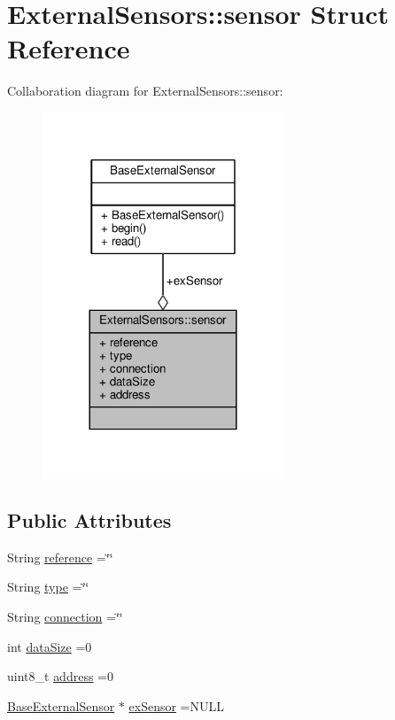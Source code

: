 \hypertarget{structExternalSensors_1_1sensor}{}\section{External\+Sensors\+:\+:sensor Struct Reference}
\label{structExternalSensors_1_1sensor}


Collaboration diagram for External\+Sensors\+:\+:sensor\+:
\nopagebreak
\begin{figure}[H]
\begin{center}
\leavevmode
\includegraphics[width=204pt]{structExternalSensors_1_1sensor__coll__graph}
\end{center}
\end{figure}
\subsection*{Public Attributes}
\begin{DoxyCompactItemize}
\item 
String \hyperlink{structExternalSensors_1_1sensor_afed5bdfd49732202a368b600cb8396fe}{reference} =\char`\"{}\char`\"{}
\item 
String \hyperlink{structExternalSensors_1_1sensor_a6acfdb02c742c2110d7bd2b5d9fce9e7}{type} =\char`\"{}\char`\"{}
\item 
String \hyperlink{structExternalSensors_1_1sensor_ae3c8c1da809f2238bc9abde37a6c6022}{connection} =\char`\"{}\char`\"{}
\item 
int \hyperlink{structExternalSensors_1_1sensor_ae9c669bb93befbe4b333920e7f357b80}{data\+Size} =0
\item 
uint8\+\_\+t \hyperlink{structExternalSensors_1_1sensor_a8d70ca58524521ed054fc6b81eb58d34}{address} =0
\item 
\hyperlink{classBaseExternalSensor}{Base\+External\+Sensor} $\ast$ \hyperlink{structExternalSensors_1_1sensor_a9bca150fd468b8d0e090e6d72c5c2b48}{ex\+Sensor} =N\+U\+LL
\end{DoxyCompactItemize}


